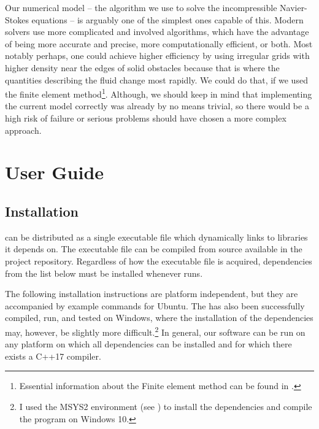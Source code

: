 \documentclass[11pt,a4paper,twoside,openright]{report}
\begin{document}
Our numerical model -- the algorithm we use to solve the incompressible Navier-Stokes equations -- is arguably one of the simplest ones capable of this. Modern solvers use more complicated and involved algorithms, which have the advantage of being more accurate and precise, more computationally efficient, or both. Most notably perhaps, one could achieve higher efficiency by using irregular grids with higher density near the edges of solid obstacles because that is where the quantities describing the fluid change most rapidly. We could do that, if we used the finite element method\footnote{Essential information about the Finite element method can be found in \cite{WikiFEM}.}. Although, we should keep in mind that implementing the current model correctly was already by no means trivial, so there would be a high risk of failure or serious problems should  have chosen a more complex approach.


\chapter{User Guide}

\section{Installation}

\pname{} can be distributed as a single executable file which dynamically links to libraries it depends on. The executable file can be compiled from source available in the project repository. Regardless of how the executable file is acquired, dependencies from the list below must be installed whenever \pname{} runs.

The following installation instructions are platform independent, but they are accompanied by example commands for Ubuntu. The \software{} has also been successfully compiled, run, and tested on Windows, where the installation of the dependencies may, however, be slightly more difficult.\footnote{I used the MSYS2 environment (see \cite{msys2}) to install the dependencies and compile the program on Windows 10.} In general, our software can be run on any platform on which all dependencies can be installed and for which there exists a C++17 compiler.
\end{document}
